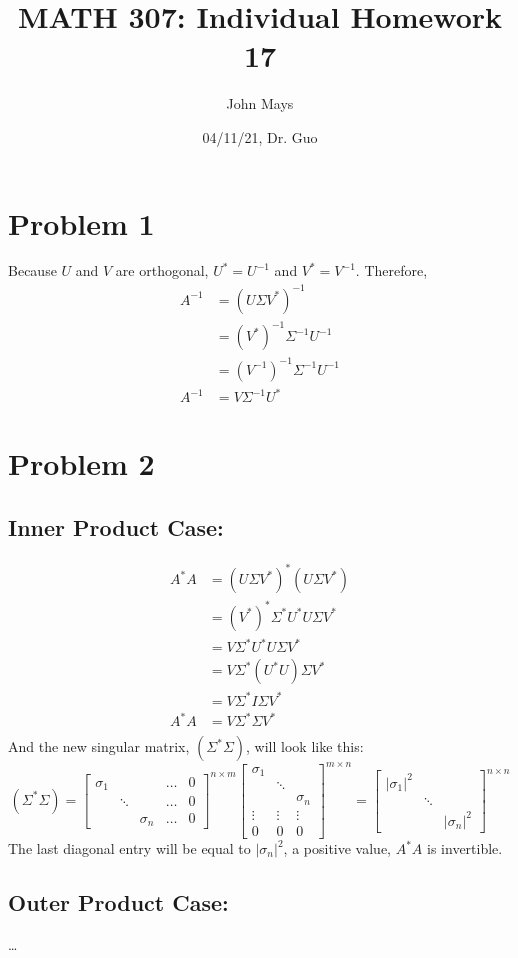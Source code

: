 \documentclass[fleqn]{article}
\title{\textbf{MATH 307: Individual Homework 17}}
\author{John Mays}
\date{04/11/21, Dr. Guo}
\begin{document}
\maketitle

\section*{Problem 1}
Because $U$ and $V$ are orthogonal, $U^{*} = U^{-1}$ and $V^{*} = V^{-1}$.  Therefore,
\begin{equation*}
    \begin{split}
        A^{-1} &= (U\Sigma V^{*})^{-1}\\
         &= (V^{*})^{-1} \Sigma ^{-1} U^{-1}\\
         &= (V^{-1})^{-1} \Sigma ^{-1} U^{-1}\\
        A^{-1} &= V \Sigma ^{-1} U^{*}
    \end{split}
\end{equation*}
\pagebreak
\section*{Problem 2}
\subsection*{Inner Product Case:}
\begin{equation*}
    \begin{split}
        A^{*}A &= (U \Sigma V^{*})^{*} (U \Sigma V^{*})\\
        &= (V^{*})^{*} \Sigma^{*} U^{*} U \Sigma V^{*}\\
        &= V \Sigma^{*} U^{*} U \Sigma V^{*}\\
        &= V \Sigma^{*} (U^{*} U) \Sigma V^{*}\\
        &= V \Sigma^{*} I \Sigma V^{*}\\
        A^{*}A &= V \Sigma^{*} \Sigma V^{*}\\
    \end{split}
\end{equation*}
And the new singular matrix, $(\Sigma^{*} \Sigma)$, will look like this: 
\begin{equation*}
    (\Sigma^{*} \Sigma) = \begin{bmatrix}\sigma_1 & & & \dots & 0\\ & \ddots & & \dots & 0 \\ & & \sigma_n & \dots & 0\end{bmatrix}^{n \times m} \begin{bmatrix}\sigma_1 \\ & \ddots \\ & & \sigma_n \\ \vdots & \vdots & \vdots \\ 0 & 0 & 0 \end{bmatrix}^{m \times n} = \begin{bmatrix}|\sigma_1|^2 \\ & \ddots \\ & & |\sigma_n|^2 \end{bmatrix}^{n \times n}
\end{equation*}
The last diagonal entry will be equal to $|\sigma_n|^2$, a positive value, $A^{*}A$ is invertible.
\subsection*{Outer Product Case:}
\dots
\end{document}
